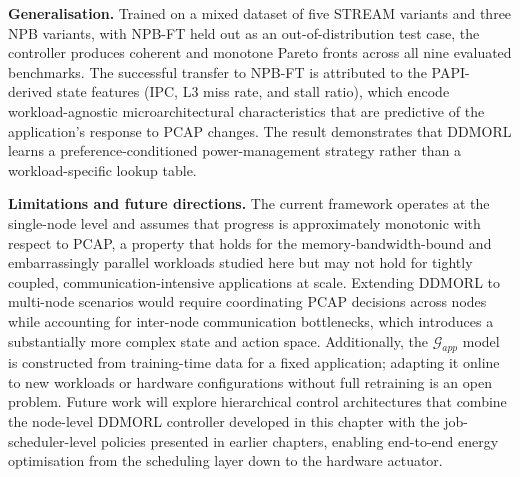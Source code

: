 \noindent\textbf{Generalisation.}
Trained on a mixed dataset of five STREAM variants and three NPB variants, with NPB-FT held out as an out-of-distribution test case, the controller produces coherent and monotone Pareto fronts across all nine evaluated benchmarks. The successful transfer to NPB-FT is attributed to the PAPI-derived state features (IPC, L3 miss rate, and stall ratio), which encode workload-agnostic microarchitectural characteristics that are predictive of the application's response to PCAP changes. The result demonstrates that DDMORL learns a preference-conditioned power-management strategy rather than a workload-specific lookup table.

\noindent\textbf{Limitations and future directions.}
The current framework operates at the single-node level and assumes that progress is approximately monotonic with respect to PCAP, a property that holds for the memory-bandwidth-bound and embarrassingly parallel workloads studied here but may not hold for tightly coupled, communication-intensive applications at scale. Extending DDMORL to multi-node scenarios would require coordinating PCAP decisions across nodes while accounting for inter-node communication bottlenecks, which introduces a substantially more complex state and action space. Additionally, the $\mathcal{G}_{app}$ model is constructed from training-time data for a fixed application; adapting it online to new workloads or hardware configurations without full retraining is an open problem. Future work will explore hierarchical control architectures that combine the node-level DDMORL controller developed in this chapter with the job-scheduler-level policies presented in earlier chapters, enabling end-to-end energy optimisation from the scheduling layer down to the hardware actuator.
